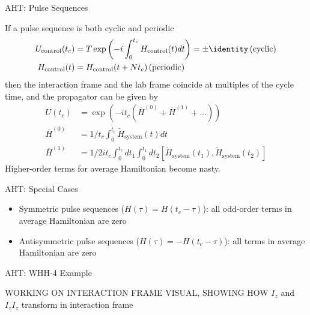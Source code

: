 \documentclass{beamer}
\begin{document}
\begin{frame}{AHT: Pulse Sequences}


If a pulse sequence is both cyclic and periodic \cite{gerstein-dybowski}
\begin{align*}
    U_\text{control}(t_c) &= T\exp \left(
        -i \int_0^{t_c} H_\text{control}(t) dt \right) = \pm \identity
         \, \text{(cyclic)} \\
    H_\text{control}(t) &= H_\text{control}(t + Nt_c) \, \text{(periodic)}
\end{align*}
then the interaction frame and the lab frame coincide at multiples of
the cycle time, and the propagator can be given by
\begin{align*}
    U(t_c) &= \exp\left( -i t_c (\overline{H}^{(0)} +
        \overline{H}^{(1)} + \dots) \right) \\
    \overline{H}^{(0)} &= 1/t_c \int_0^{t_c}
        \widetilde{H}_\text{system}(t) dt \\
    \overline{H}^{(1)} &= 1/2it_c \int_0^{t_c} dt_1 \int_0^{t_1} dt_2
        [\widetilde{H}_\text{system}(t_1), \widetilde{H}_\text{system}(t_2)]
\end{align*}
Higher-order terms for average Hamiltonian become nasty.

\end{frame}

\begin{frame}{AHT: Special Cases}

\begin{itemize}

\item
  Symmetric pulse sequences (\(H(\tau) = H(t_c - \tau)\)): all odd-order
  terms in average Hamiltonian are zero
\item
  Antisymmetric pulse sequences (\(H(\tau) = - H(t_c - \tau)\)): all
  terms in average Hamiltonian are zero
\end{itemize}
\end{frame}

\begin{frame}{AHT: WHH-4 Example}


WORKING ON INTERACTION FRAME VISUAL, SHOWING HOW $I_z$ and $I_z I_z$ transform in interaction frame

\end{frame}
\end{document}
